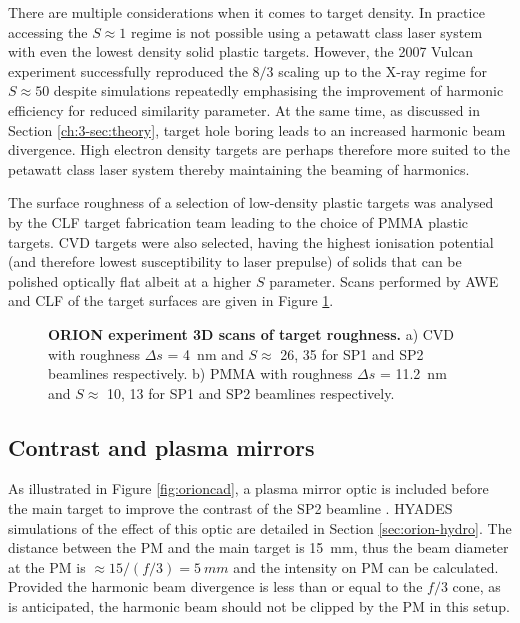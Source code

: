 There are multiple considerations when it comes to target density. In practice accessing the $S\approx 1$ regime is not possible using a petawatt class laser system with even the lowest density solid plastic targets. However, the 2007 Vulcan experiment successfully reproduced the $8/3$ scaling up to the X-ray regime for $S \approx 50 $ \cite{dromeyBrightMultikeVHarmonic2007} despite simulations repeatedly emphasising the improvement of harmonic efficiency for reduced similarity parameter. At the same time, as discussed in Section \ref{ch:3-sec:theory}, target hole boring leads to an increased harmonic beam divergence. High electron density targets are perhaps therefore more suited to the petawatt class laser system thereby maintaining the beaming of harmonics.

The surface roughness of a selection of low-density plastic targets was analysed by the CLF target fabrication team leading to the choice of PMMA plastic targets. CVD targets were also selected, having the highest ionisation potential (and therefore lowest susceptibility to laser prepulse) of solids that can be polished optically flat albeit at a higher $S$ parameter. Scans performed by AWE and CLF of the target surfaces are given in Figure \ref{fig:oriontargets}.
\begin{figure}
	\centering
	\caption[ORION HHG experiment targets]{\textbf{ORION experiment 3D scans of target roughness.} a) CVD with roughness $\Delta s$ = \qty{4}{nm} and $S \approx$ 26, 35 for SP1 and SP2 beamlines respectively. b) PMMA with roughness $\Delta s$ = \qty{11.2}{nm} and $S \approx$ 10, 13 for SP1 and SP2 beamlines respectively.}
	\label{fig:oriontargets}
\end{figure}

\subsection{Contrast and plasma mirrors}
As illustrated in Figure \ref{fig:orioncad}, a plasma mirror optic is included before the main target to improve the contrast of the SP2 beamline \cite{doumyCompleteCharacterizationPlasma2004}. HYADES simulations of the effect of this optic are detailed in Section \ref{sec:orion-hydro}. The distance between the PM and the main target is \qty{15}{mm}, thus the beam diameter at the PM is $\approx 15/(f/3) = \qty{5}{mm}$ and the intensity on PM can be calculated. Provided the harmonic beam divergence is less than or equal to the $f/3$ cone, as is anticipated, the harmonic beam should not be clipped by the PM in this setup. 

